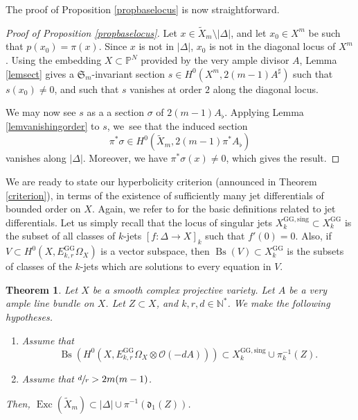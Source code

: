 \documentclass[JEP,XML,SOM,Unicode, NoEqCountersInSection,NoFloatCountersInSection,published]{cedram}
\let\mathcal\mathscr
\newcommand{\rGG}{\mathrm{GG}}
\newcommand{\sing}{\mathrm{sing}}
\DeclareMathOperator{\Bs}{Bs}
\DeclareMathOperator{\Exc}{Exc}
\theoremstyle{theorem}
\newtheorem{theorem}{Theorem}
\theoremstyle{definition}
\begin{document}
The proof of Proposition \ref{propbaselocus} is now straightforward.

\begin{proof}[Proof of Proposition \ref{propbaselocus}]

Let $x \in \widetilde{X}_m \setminus |\Delta|$, and let $x_0 \in X^m$ be such that $p(x_0) = \pi (x)$. Since $x$ is not in $|\Delta|$, $x_0$ is not in the diagonal locus of $X^m$. Using the embedding $X \subset \mathbb P^N$ provided by the very ample divisor $A$, Lemma \ref{lemsect} gives a $\mathfrak{S}_m$-invariant section $s \in H^0( X^m, 2(m-1) A^\sharp)$ such that $s(x_0) \neq 0$, and such that $s$ vanishes at order $2$ along the diagonal locus.

We may now see \(s\) as a a section \(\sigma\) of \(2(m-1)A_{\flat}\). Applying Lemma \ref{lemvanishingorder} to $s$, we~see that the induced section
\[
\pi^\ast \sigma \in H^0(\widetilde{X}_m, 2(m-1) \pi^\ast A_\flat)
\]
vanishes along $|\Delta|$. Moreover, we have $\pi^\ast \sigma(x) \neq 0$, which gives the result.
\end{proof}

We are ready to state our hyperbolicity criterion (announced in Theorem \ref{criterion}), in terms of the existence of sufficiently many jet differentials of bounded order on $X$. Again, we refer to \cite{dem12a} for the basic definitions related to jet differentials. Let us simply recall that the locus of singular jets $X_k^{\rGG, \sing} \subset X_k^{\rGG}$ is the subset of all classes of $k$-jets $[f : \Delta \to X]_k$ such that $f'(0) = 0$. Also, if $V \subset H^0(X, E_{k,r}^{\rGG} \Omega_X)$ is a vector subspace, then $\Bs(V) \subset X_k^{\rGG}$ is the subsets of classes of the $k$-jets which are solutions to every equation in $V$.

\begin{theorem} \label{thmhypcrit}
Let $X$ be a smooth complex projective variety. Let $A$ be a very ample line bundle on $X$. Let $Z \subset X$, and $k, r ,d \in \mathbb N^\ast$. We make the following hypotheses.

\begin{enumerate}
\item\label{thmhypcrit1} Assume that
\[
\Bs \left(H^0 (X, E_{k,r}^{\rGG} \Omega_X \otimes \mathcal O(- d A)) \right) \subset X_k^{\rGG, \sing} \cup \pi_k^{-1}(Z).
\]

\item\label{thmhypcrit2} Assume that $\sfrac{d}{r} > 2 m(m-1)$.
\end{enumerate}
Then, $\Exc(\widetilde{X}_m) \subset |\Delta| \cup \pi^{-1}(\mathfrak{d}_1(Z))$.
\end{theorem}
\end{document}
